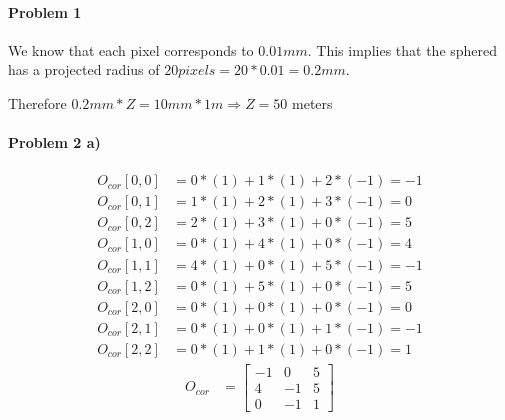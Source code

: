 \documentclass[11pt]{article}
\begin{document}
\MakeScribeTop


\paragraph{\noindent\textbf{\LARGE{Problem 1}}}


\begin{flushleft}
    We know that each pixel corresponds to $0.01 mm$. This implies that the sphered has 
    a projected radius of $20 pixels = 20 * 0.01 = 0.2 mm$. 

    Therefore $0.2mm*Z = 10mm * 1 m \Rightarrow Z = 50$ meters
\end{flushleft}   

\paragraph{\noindent\textbf{\LARGE{Problem 2 a)}}}


\begin{equation*}
\begin{split}
    O_{cor}[0,0] & = 0*(1) + 1*(1) + 2*(-1) = -1 \\ 
    O_{cor}[0,1] & = 1*(1) + 2*(1) + 3*(-1) = 0 \\ 
    O_{cor}[0,2] & = 2*(1) + 3*(1) + 0*(-1) = 5 \\ 
    O_{cor}[1,0] & = 0*(1) + 4*(1) + 0*(-1) = 4 \\ 
    O_{cor}[1,1] & = 4*(1) + 0*(1) + 5*(-1) = -1 \\ 
    O_{cor}[1,2] & = 0*(1) + 5*(1) + 0*(-1) = 5 \\ 
    O_{cor}[2,0] & = 0*(1) + 0*(1) + 0*(-1) = 0 \\ 
    O_{cor}[2,1] & = 0*(1) + 0*(1) + 1*(-1) = -1 \\ 
    O_{cor}[2,2] & = 0*(1) + 1*(1) + 0*(-1) = 1 
\end{split}
\end{equation*}
\begin{equation*}
\begin{split}
O_{cor} & =  
\begin{bmatrix} -1 &0 &5 \\ 4 &-1 &5 \\ 0 &-1 &1 \end{bmatrix} 
\end{split}
\end{equation*}
\end{document}
